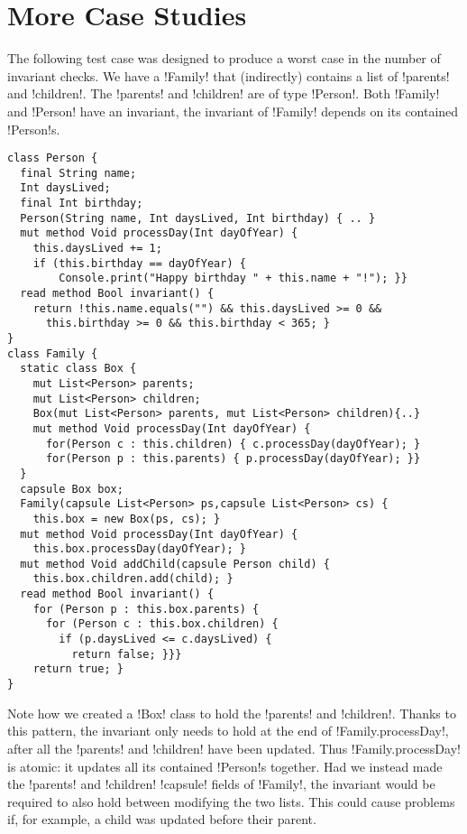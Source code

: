 

\section{More Case Studies}
\label{s:MoreCaseStudies}
The following test case was designed to produce a worst case in the number of invariant checks. We have a \Q!Family! that (indirectly) contains a list of \Q!parents! and \Q!children!. The \Q!parents! and \Q!children! are of type \Q!Person!. Both \Q!Family! and \Q!Person! have an invariant, the invariant of \Q!Family! depends on its contained \Q!Person!s.


\begin{lstlisting}
class Person { 
  final String name;
  Int daysLived;
  final Int birthday;
  Person(String name, Int daysLived, Int birthday) { .. }
  mut method Void processDay(Int dayOfYear) {
  	this.daysLived += 1;
    if (this.birthday == dayOfYear) {
    	Console.print("Happy birthday " + this.name + "!"); }}
  read method Bool invariant() {
    return !this.name.equals("") && this.daysLived >= 0 &&
      this.birthday >= 0 && this.birthday < 365; }
}
class Family { 
  static class Box { 
    mut List<Person> parents;
    mut List<Person> children;
    Box(mut List<Person> parents, mut List<Person> children){..}
    mut method Void processDay(Int dayOfYear) {
      for(Person c : this.children) { c.processDay(dayOfYear); }
      for(Person p : this.parents) { p.processDay(dayOfYear); }}
  }
  capsule Box box;
  Family(capsule List<Person> ps,capsule List<Person> cs) {
    this.box = new Box(ps, cs); }
  mut method Void processDay(Int dayOfYear) { 
    this.box.processDay(dayOfYear); }
  mut method Void addChild(capsule Person child) { 
    this.box.children.add(child); }
  read method Bool invariant() {
    for (Person p : this.box.parents) {
      for (Person c : this.box.children) {
        if (p.daysLived <= c.daysLived) { 
          return false; }}}
    return true; }
}
\end{lstlisting}
Note how we created a \Q!Box! class to hold the \Q!parents! and \Q!children!.
Thanks to this pattern, the invariant only needs to hold at the end of \Q!Family.processDay!, after all the \Q!parents! and \Q!children! have been updated. Thus \Q!Family.processDay! is atomic: it updates all its contained \Q!Person!s together.
Had we instead made the \Q!parents! and \Q!children! \Q!capsule! fields of \Q!Family!, the invariant would be required to also hold between modifying the two lists. This could cause problems if, for example, a child was updated before their parent.

